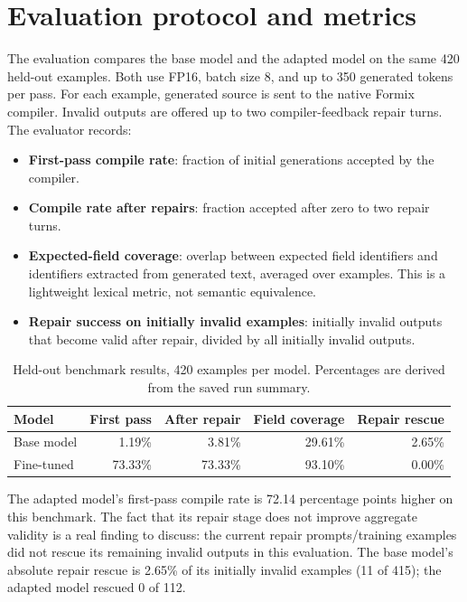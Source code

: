 \documentclass[11pt,a4paper]{article}
\begin{document}
\section{Evaluation protocol and metrics}
The evaluation compares the base model and the adapted model on the same 420 held-out examples. Both use FP16, batch size 8, and up to 350 generated tokens per pass. For each example, generated source is sent to the native Formix compiler. Invalid outputs are offered up to two compiler-feedback repair turns. The evaluator records:
\begin{itemize}
  \item \textbf{First-pass compile rate}: fraction of initial generations accepted by the compiler.
  \item \textbf{Compile rate after repairs}: fraction accepted after zero to two repair turns.
  \item \textbf{Expected-field coverage}: overlap between expected field identifiers and identifiers extracted from generated text, averaged over examples. This is a lightweight lexical metric, not semantic equivalence.
  \item \textbf{Repair success on initially invalid examples}: initially invalid outputs that become valid after repair, divided by all initially invalid outputs.
\end{itemize}

\begin{table}[H]
\centering
\caption{Held-out benchmark results, 420 examples per model. Percentages are derived from the saved run summary.}
\begin{tabular}{lrrrr}
\toprule
Model & First pass & After repair & Field coverage & Repair rescue \\
\midrule
Base model & 1.19\% & 3.81\% & 29.61\% & 2.65\% \\
Fine-tuned & 73.33\% & 73.33\% & 93.10\% & 0.00\% \\
\bottomrule
\end{tabular}
\end{table}

The adapted model's first-pass compile rate is 72.14 percentage points higher on this benchmark. The fact that its repair stage does not improve aggregate validity is a real finding to discuss: the current repair prompts/training examples did not rescue its remaining invalid outputs in this evaluation. The base model's absolute repair rescue is 2.65\% of its initially invalid examples (11 of 415); the adapted model rescued 0 of 112.
\end{document}
